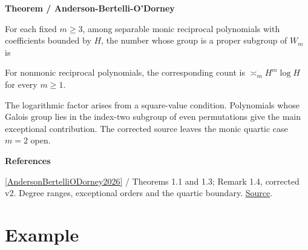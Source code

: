 \documentclass[11pt,a4paper,oneside,openany]{book}
\newcommand{\atlasdisplay}[1]{\par\begingroup\centering\vspace{3pt}\noindent\adjustbox{max width=\linewidth}{\(\displaystyle #1\)}\par\vspace{5pt}\endgroup}
\newenvironment{sources}{\par\smallskip\begingroup\footnotesize\color{atlasgray}\leftskip=10pt\setlength{\parskip}{2pt}}{\par\endgroup\smallskip}
\begin{document}
\begin{atlasblock}[standard]
\textbf{\sffamily Theorem  /  Anderson-Bertelli-O'Dorney}\par\smallskip
\color{black} For each fixed \(m\ge3\), among separable monic reciprocal polynomials with coefficients bounded by \(H\), the number whose group is a proper subgroup of \(W_m\) is\par

\atlasdisplay{\asymp_m H^{m-1}\log H.}
\color{black} For nonmonic reciprocal polynomials, the corresponding count is \(\asymp_m H^m\log H\) for every \(m\ge1\).\par
\end{atlasblock}\color{black}
\color{black} The logarithmic factor arises from a square-value condition. Polynomials whose Galois group lies in the index-two subgroup of even permutations give the main exceptional contribution. The corrected source leaves the monic quartic case \(m=2\) open.\par
\begin{sources}
\textbf{References}\par\smallskip
\noindent\hyperlink{ref:AndersonBertelliODorney2026}{[AndersonBertelliODorney2026]} / Theorems 1.1 and 1.3; Remark 1.4, corrected v2. Degree ranges, exceptional orders and the quartic boundary. \href{https://arxiv.org/abs/2406.18970v2}{Source}.\par
\end{sources}\color{black}
\section{Example}
\end{document}
